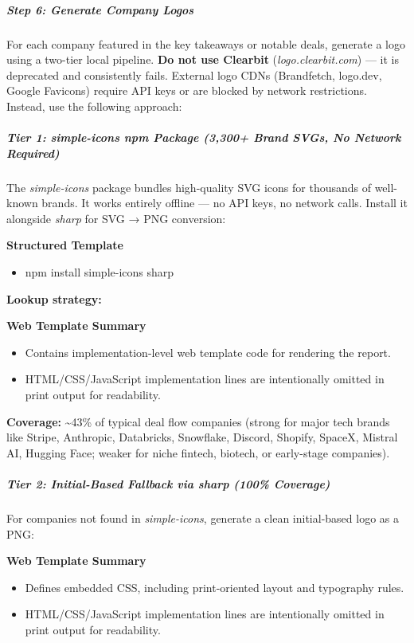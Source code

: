 \documentclass[11pt]{article}
\begin{document}
\subparagraph{Step 6: Generate Company Logos}\mbox{}\par

For each company featured in the key takeaways or notable deals, generate a logo using a two-tier local pipeline. \textbf{Do not use Clearbit} (\emph{logo.clearbit.com}) — it is deprecated and consistently fails. External logo CDNs (Brandfetch, logo.dev, Google Favicons) require API keys or are blocked by network restrictions. Instead, use the following approach:


\subparagraph{Tier 1: \emph{simple-icons} npm Package (3,300+ Brand SVGs, No Network Required)}\mbox{}\par

The \emph{simple-icons} package bundles high-quality SVG icons for thousands of well-known brands. It works entirely offline — no API keys, no network calls. Install it alongside \emph{sharp} for SVG → PNG conversion:


\textbf{Structured Template}
\begin{itemize}[leftmargin=*,itemsep=2pt,topsep=2pt]
\item {} npm install simple-icons sharp
\end{itemize}

\textbf{Lookup strategy:}


\textbf{Web Template Summary}
\begin{itemize}[leftmargin=*,itemsep=2pt,topsep=2pt]
\item {} Contains implementation-level web template code for rendering the report.
\item {} HTML/CSS/JavaScript implementation lines are intentionally omitted in print output for readability.
\end{itemize}

\textbf{Coverage:} \textasciitilde{}43\% of typical deal flow companies (strong for major tech brands like Stripe, Anthropic, Databricks, Snowflake, Discord, Shopify, SpaceX, Mistral AI, Hugging Face; weaker for niche fintech, biotech, or early-stage companies).


\subparagraph{Tier 2: Initial-Based Fallback via \emph{sharp} (100\% Coverage)}\mbox{}\par

For companies not found in \emph{simple-icons}, generate a clean initial-based logo as a PNG:


\textbf{Web Template Summary}
\begin{itemize}[leftmargin=*,itemsep=2pt,topsep=2pt]
\item {} Defines embedded CSS, including print-oriented layout and typography rules.
\item {} HTML/CSS/JavaScript implementation lines are intentionally omitted in print output for readability.
\end{itemize}
\end{document}
